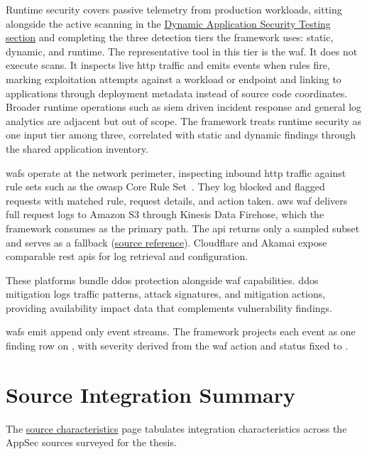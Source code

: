 Runtime security covers passive telemetry from production workloads, sitting alongside the active scanning in the \hyperref[sec:dynamic-appsec]{Dynamic Application Security Testing section} and completing the three detection tiers the framework uses: static, dynamic, and runtime. The representative tool in this tier is the \gls{waf}. It does not execute scans. It inspects live \gls{http} traffic and emits events when rules fire, marking exploitation attempts against a workload or endpoint and linking to applications through deployment metadata instead of source code coordinates. Broader runtime operations such as \gls{siem} driven incident response and general log analytics are adjacent but out of scope. The framework treats runtime security as one input tier among three, correlated with static and dynamic findings through the shared application inventory.

\Glspl{waf} operate at the network perimeter, inspecting inbound \gls{http} traffic against rule sets such as the \gls{owasp} Core Rule Set~\cite{OWASPCRS2024}. They log blocked and flagged requests with matched rule, request details, and action taken. \gls{aws} \gls{waf} delivers full request logs to Amazon S3 through Kinesis Data Firehose, which the framework consumes as the primary path. The  \gls{api} returns only a sampled subset and serves as a fallback (\href{https://vkraus.github.io/appsec-mvp/connectors/waf/aws-waf/}{source reference}). Cloudflare and Akamai expose comparable \gls{rest} \glspl{api} for log retrieval and configuration.

These platforms bundle \gls{ddos} protection alongside \gls{waf} capabilities. \gls{ddos} mitigation logs traffic patterns, attack signatures, and mitigation actions, providing availability impact data that complements vulnerability findings.

\Glspl{waf} emit append only event streams. The framework projects each event as one finding row on , with severity derived from the \gls{waf} action and status fixed to .


\section{Source Integration Summary}
\label{sec:source-integration-summary}

The \href{https://vkraus.github.io/appsec-mvp/platform/reference/source-characteristics/}{source characteristics} page tabulates integration characteristics across the AppSec sources surveyed for the thesis.

